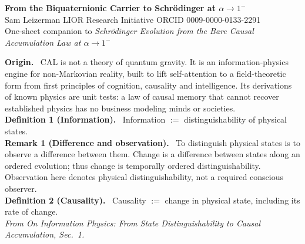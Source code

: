 \documentclass[9pt]{extarticle}
\begin{document}
\begin{center}
{\Large\bfseries\color{ink} From the Biquaternionic Carrier to Schr\"odinger at $\alpha\to1^-$}\\[2pt]
{\small Sam Leizerman \;\textbullet\; LIOR Research Initiative \;\textbullet\; ORCID 0009-0000-0133-2291}\\[1pt]
{\small\color{note} One-sheet companion to \textit{Schr\"odinger Evolution from the Bare Causal Accumulation Law at $\alpha\to1^-$}}
\end{center}
\vspace{-4pt}

\begin{tcolorbox}[colback=ink!4,colframe=ink!60,boxrule=0.5pt,left=5pt,right=5pt,top=3pt,bottom=3pt]
\small
\textbf{Origin.} \ CAL is not a theory of quantum gravity. It is an information-physics engine for non-Markovian reality, built to lift self-attention to a field-theoretic form from first principles of cognition, causality and intelligence. Its derivations of known physics are unit tests: a law of causal memory that cannot recover established physics has no business modeling minds or societies.\\[2pt]
\textbf{Definition 1 (Information).} \ Information $:=$ distinguishability of physical states.\\[2pt]
\textbf{Remark 1 (Difference and observation).} \ To distinguish physical states is to observe a difference between them. Change is a difference between states along an ordered evolution; thus change is temporally ordered distinguishability. Observation here denotes physical distinguishability, not a required conscious observer.\\[2pt]
\textbf{Definition 2 (Causality).} \ Causality $:=$ change in physical state, including its rate of change.\\[1pt]
{\color{note}\footnotesize\textit{From On Information Physics: From State Distinguishability to Causal Accumulation, Sec.~1.}}
\end{tcolorbox}
\end{document}

